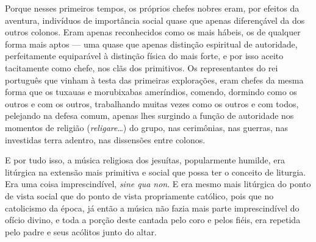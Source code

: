 Porque nesses primeiros tempos, os próprios chefes nobres eram, por
efeitos da aventura, indivíduos de importância social quase que apenas
diferençável da dos outros colonos. Eram apenas reconhecidos como os
mais hábeis, os de qualquer forma mais aptos --- uma quase que apenas
distinção espiritual de autoridade, perfeitamente equiparável à
distinção física do mais forte, e por isso aceito tacitamente como
chefe, nos clãs dos primitivos. Os representantes do rei português que
vinham à testa das primeiras explorações, eram chefes da mesma forma que
os tuxauas e morubixabas ameríndios, comendo, dormindo como os outros e
com os outros, trabalhando muitas vezes como os outros e com todos,
pelejando na defesa comum, apenas lhes surgindo a função de autoridade
nos momentos de religião (\textit{religare}\ldots{}) do grupo, nas cerimônias, nas
guerras, nas investidas terra adentro, nas dissensões entre colonos.

E por tudo isso, a música religiosa dos jesuítas, popularmente humilde,
era litúrgica na extensão mais primitiva e social que possa ter o
conceito de liturgia. Era uma coisa imprescindível, \textit{sine qua non}. E era
mesmo mais litúrgica do ponto de vista social que do ponto de vista
propriamente católico, pois que no catolicismo da época, já então a
música não fazia mais parte imprescindível do ofício divino, e toda a
porção deste cantada pelo coro e pelos fiéis, era repetida pelo padre e
seus acólitos junto do altar.

